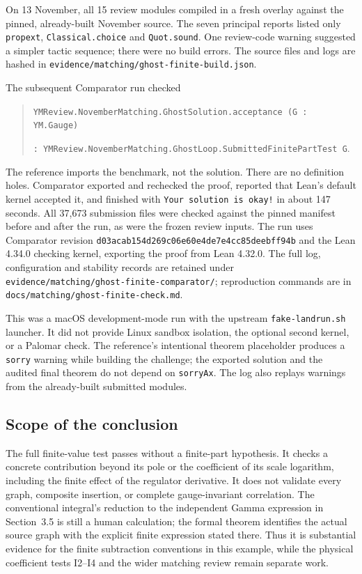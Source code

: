 \documentclass[11pt]{article}
\newcommand{\code}[1]{{\small\nolinkurl{#1}}}
\begin{document}
On 13 November, all 15 review modules compiled in a fresh overlay
against the pinned, already-built November source. The seven principal
reports listed only \code{propext}, \code{Classical.choice} and
\code{Quot.sound}. One review-code warning suggested a simpler tactic
sequence; there were no build errors. The source files and logs are
hashed in \code{evidence/matching/ghost-finite-build.json}.

The subsequent Comparator run checked
\begin{quote}
\code{YMReview.NovemberMatching.GhostSolution.acceptance (G : YM.Gauge)}\par
\code{: YMReview.NovemberMatching.GhostLoop.SubmittedFinitePartTest G}.
\end{quote}
The reference imports the benchmark, not the solution. There are no
definition holes. Comparator exported and rechecked the proof,
reported that Lean's default kernel accepted it, and finished with
\texttt{Your solution is okay!} in about 147 seconds. All 37,673
submission files were checked against the pinned manifest before and
after the run, as were the frozen review inputs. The run uses Comparator
revision \code{d03acab154d269c06e60e4de7e4cc85deebff94b} and the Lean
4.34.0 checking kernel, exporting the proof from Lean 4.32.0.
The full log, configuration and stability records are retained under
\code{evidence/matching/ghost-finite-comparator/}; reproduction commands
are in \code{docs/matching/ghost-finite-check.md}.

This was a macOS development-mode run with the upstream
\code{fake-landrun.sh} launcher. It did not provide Linux sandbox
isolation, the optional second kernel, or a Palomar check. The reference's
intentional theorem placeholder produces a \code{sorry} warning while
building the challenge; the exported solution and the audited final
theorem do not depend on \code{sorryAx}. The log also replays warnings
from the already-built submitted modules.

\subsection{Scope of the conclusion}

The full finite-value test passes without a finite-part hypothesis.
It checks a concrete contribution beyond its pole or the coefficient
of its scale logarithm, including the finite effect of the regulator
derivative. It does not validate every graph, composite insertion,
or complete gauge-invariant correlation. The conventional integral's
reduction to the independent Gamma expression in Section~3.5 is still
a human calculation; the formal theorem identifies the actual source
graph with the explicit finite expression stated there. Thus it is
substantial evidence for the finite subtraction conventions in this
example, while the physical coefficient tests I2--I4 and the wider
matching review remain separate work.
\end{document}
